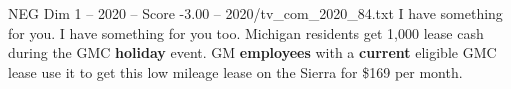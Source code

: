 \begin{textsample}{NEG Dim 1 – 2020 – Score -3.00 – 2020/tv\_com\_2020\_84.txt}  \label{ex:f1_neg_002}
I have something for you.
I have something for you too.
Michigan residents get 1,000 lease cash during the GMC \textbf{holiday} event.
GM \textbf{employees} with a \textbf{current} eligible GMC lease use it to get this low mileage lease on the Sierra for \$169 per month.

\end{textsample}
